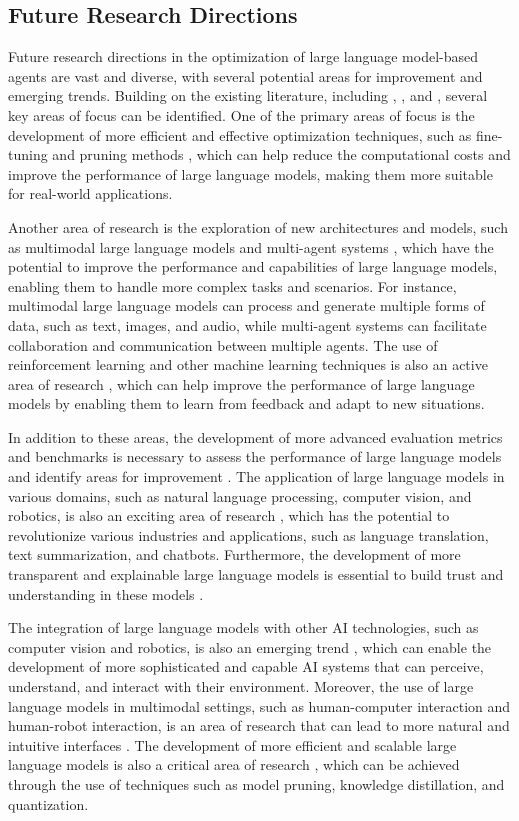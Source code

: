 \documentclass[11pt]{article}
\begin{document}
\subsection{Future Research Directions}

Future research directions in the optimization of large language model-based agents are vast and diverse, with several potential areas for improvement and emerging trends. Building on the existing literature, including \cite{ref357}, \cite{ref358}, and \cite{ref228}, several key areas of focus can be identified. One of the primary areas of focus is the development of more efficient and effective optimization techniques, such as fine-tuning and pruning methods \cite{ref104}, which can help reduce the computational costs and improve the performance of large language models, making them more suitable for real-world applications.

Another area of research is the exploration of new architectures and models, such as multimodal large language models and multi-agent systems \cite{ref359}, which have the potential to improve the performance and capabilities of large language models, enabling them to handle more complex tasks and scenarios. For instance, multimodal large language models can process and generate multiple forms of data, such as text, images, and audio, while multi-agent systems can facilitate collaboration and communication between multiple agents. The use of reinforcement learning and other machine learning techniques is also an active area of research \cite{ref165}, which can help improve the performance of large language models by enabling them to learn from feedback and adapt to new situations.

In addition to these areas, the development of more advanced evaluation metrics and benchmarks is necessary to assess the performance of large language models and identify areas for improvement \cite{ref351}. The application of large language models in various domains, such as natural language processing, computer vision, and robotics, is also an exciting area of research \cite{ref20}, which has the potential to revolutionize various industries and applications, such as language translation, text summarization, and chatbots. Furthermore, the development of more transparent and explainable large language models is essential to build trust and understanding in these models \cite{ref360}.

The integration of large language models with other AI technologies, such as computer vision and robotics, is also an emerging trend \cite{ref49}, which can enable the development of more sophisticated and capable AI systems that can perceive, understand, and interact with their environment. Moreover, the use of large language models in multimodal settings, such as human-computer interaction and human-robot interaction, is an area of research that can lead to more natural and intuitive interfaces \cite{ref25}. The development of more efficient and scalable large language models is also a critical area of research \cite{ref361}, which can be achieved through the use of techniques such as model pruning, knowledge distillation, and quantization.
\end{document}
